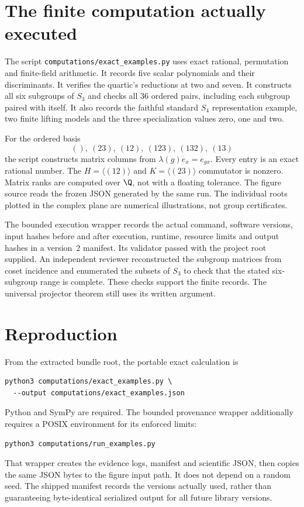 \section{The finite computation actually executed}

The script \texttt{computations/exact\_examples.py} uses exact rational, permutation and finite-field arithmetic. It records five scalar polynomials and their discriminants. It verifies the quartic's reductions at two and seven. It constructs all six subgroups of $S_3$ and checks all $36$ ordered pairs, including each subgroup paired with itself. It also records the faithful standard $S_4$ representation example, two finite lifting models and the three specialization values zero, one and two.

For the ordered basis
\[
 (),\ (23),\ (12),\ (123),\ (132),\ (13)
\]
the script constructs matrix columns from $\lambda(g)e_x=e_{gx}$. Every entry is an exact rational number. The $H=\langle(12)\rangle$ and $K=\langle(23)\rangle$ commutator is nonzero. Matrix ranks are computed over $\Q$, not with a floating tolerance. The figure source reads the frozen JSON generated by the same run. The individual roots plotted in the complex plane are numerical illustrations, not group certificates.

The bounded execution wrapper records the actual command, software versions, input hashes before and after execution, runtime, resource limits and output hashes in a version~2 manifest. Its validator passed with the project root supplied. An independent reviewer reconstructed the subgroup matrices from coset incidence and enumerated the subsets of $S_3$ to check that the stated six-subgroup range is complete. These checks support the finite records. The universal projector theorem still uses its written argument.

\section{Reproduction}

From the extracted bundle root, the portable exact calculation is
\begin{lstlisting}
python3 computations/exact_examples.py \
  --output computations/exact_examples.json
\end{lstlisting}
Python and SymPy are required. The bounded provenance wrapper additionally requires a POSIX environment for its enforced limits:
\begin{lstlisting}
python3 computations/run_examples.py
\end{lstlisting}
That wrapper creates the evidence logs, manifest and scientific JSON, then copies the same JSON bytes to the figure input path. It does not depend on a random seed. The shipped manifest records the versions actually used, rather than guaranteeing byte-identical serialized output for all future library versions.

